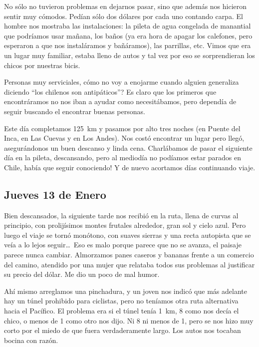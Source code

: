 No s\'olo no tuvieron problemas en dejarnos pasar, sino que adem\'as nos
hicieron sentir muy c\'omodos. Ped\'ian s\'olo dos d\'olares por cada uno
contando carpa. El hombre nos mostraba las instalaciones: la pileta de agua
congelada de manantial que podr\'iamos usar ma\~nana, los ba\~nos (ya era hora
de apagar los calefones, pero esperaron a que nos instal\'aramos y
ba\~n\'aramos), las parrillas, etc. Vimos que era un lugar muy familiar, estaba
lleno de autos y tal vez por eso se sorprendieran los chicos por nuestras bicis.

Personas muy serviciales, \textquestiondown c\'omo no voy a enojarme cuando
alguien generaliza diciendo ``los chilenos son antip\'aticos''? Es claro que los
primeros que encontr\'aramos no nos iban a ayudar como necesit\'abamos, pero
depend\'ia de seguir buscando el encontrar buenas personas.

Este d\'ia completamos 125~km y pasamos por alto tres noches (en Puente del
Inca, en Las Cuevas y en Los Andes). Nos cost\'o encontrar un lugar pero
lleg\'o, asegur\'andonos un buen descanso y linda cena. Charl\'abamos de pasar
el siguiente d\'ia en la pileta, descansando, pero al mediod\'ia no pod\'iamos
estar parados en Chile, \textexclamdown hab\'ia que seguir conociendo! Y de
nuevo acortamos d\'ias continuando viaje.

\subsection*{Jueves 13 de Enero}

Bien descansados, la siguiente tarde nos recibi\'o en la ruta, llena de curvas
al principio, con prolij\'isimos montes frutales alrededor, gran sol y cielo
azul. Pero luego el viaje se torn\'o mon\'otono, con suaves sierras y una recta
autopista que se ve\'ia a lo lejos seguir\ldots\ Eso es malo porque parece que
no se avanza, el paisaje parece nunca cambiar. Almorzamos panes caseros y
bananas frente a un comercio del camino, atendido por una mujer que relataba
todos sus problemas al justificar su precio del d\'olar. Me dio un poco de mal
humor.

Ah\'i mismo arreglamos una pinchadura, y un joven nos indic\'o que m\'as
adelante hay un t\'unel prohibido para ciclistas, pero no ten\'iamos otra ruta
alternativa hacia el Pac\'ifico. El problema era si el t\'unel ten\'ia 1~km, 8
como nos dec\'ia el chico, o menos de 1 como otro nos dijo. Ni 8 ni menos de 1,
pero se nos hizo muy corto por el miedo de que fuera verdaderamente largo. Los
autos nos tocaban bocina con raz\'on.

